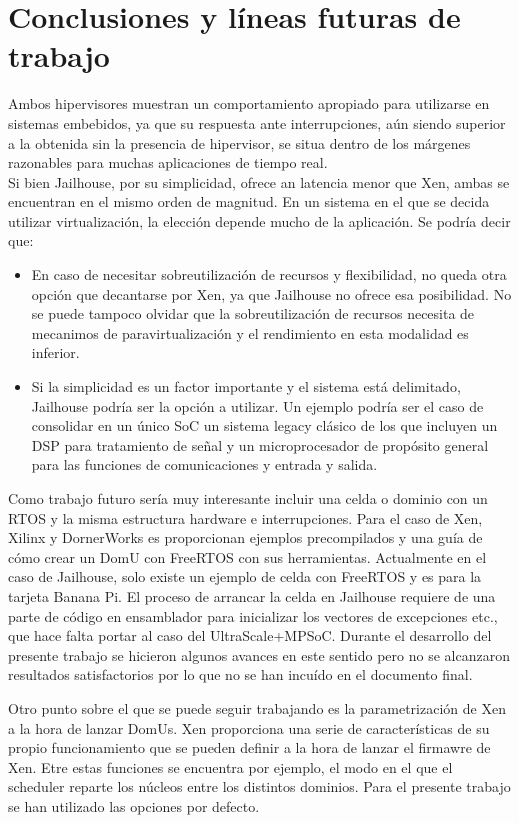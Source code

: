 \chapter{Conclusiones y líneas futuras de trabajo}

Ambos hipervisores muestran un comportamiento apropiado para utilizarse en sistemas embebidos, ya que su respuesta ante interrupciones, aún siendo superior a la obtenida sin la presencia de hipervisor, se situa dentro de los márgenes razonables para muchas aplicaciones de tiempo real.\\

Si bien Jailhouse, por su simplicidad, ofrece an latencia menor que Xen, ambas se encuentran en el mismo orden de magnitud. En un sistema en el que se decida utilizar virtualización, la elección depende mucho de la aplicación. Se podría decir que:

\begin{itemize}
  \item En caso de necesitar sobreutilización de recursos y flexibilidad, no queda otra opción que decantarse por Xen, ya que Jailhouse no ofrece esa posibilidad. No se puede tampoco olvidar que la sobreutilización de recursos necesita de mecanimos de paravirtualización y el rendimiento en esta modalidad es inferior.

 \item Si la simplicidad es un factor importante y el sistema está delimitado, Jailhouse podría ser la opción a utilizar. Un ejemplo podría ser el caso de consolidar en un único \acrshort{SoC} un sistema legacy clásico de los que incluyen un \acrshort{DSP} para tratamiento de señal y un microprocesador de propósito general para las funciones de comunicaciones y entrada y salida.

\end{itemize}

Como trabajo futuro sería muy interesante incluir una celda o dominio con un \acrshort{RTOS} y la misma estructura hardware e interrupciones. Para el caso de Xen, Xilinx y DornerWorks es proporcionan ejemplos precompilados y una guía de cómo crear un DomU con FreeRTOS con sus herramientas. Actualmente en el caso de Jailhouse, solo existe un ejemplo de celda con FreeRTOS y es para la tarjeta Banana Pi. El proceso de arrancar la celda en Jailhouse requiere de una parte de código en ensamblador para inicializar los vectores de excepciones etc., que hace falta portar al caso del UltraScale+\texttrademark MPSoC. Durante el desarrollo del presente trabajo se hicieron algunos avances en este sentido pero no se alcanzaron resultados satisfactorios por lo que no se han incuído en el documento final.

Otro punto sobre el que se puede seguir trabajando es la parametrización de Xen a la hora de lanzar DomUs. Xen proporciona una serie de características de su propio funcionamiento que se pueden definir a la hora de lanzar el firmawre de Xen. Etre estas funciones se encuentra por ejemplo, el modo en el que el scheduler reparte los núcleos entre los distintos dominios. Para el presente trabajo se han utilizado las opciones por defecto.

